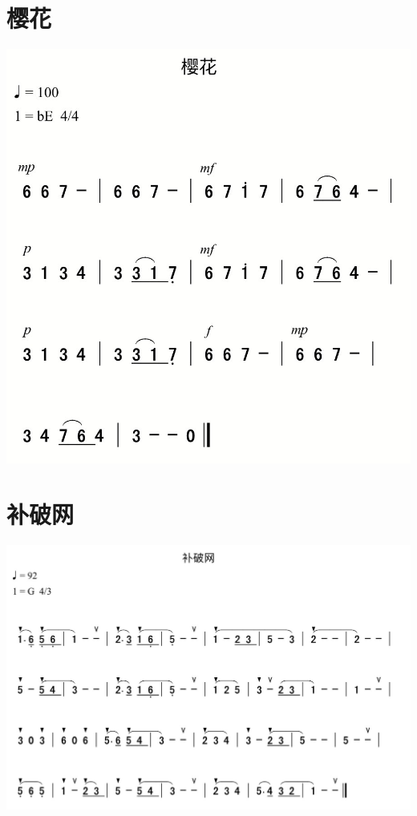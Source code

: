 \documentclass[cn,pad,chinese,chinesefont=nofont]{elegantbook}
\begin{document}
\section{樱花}
	\includegraphics[width=\textwidth]{dongxiao/IMG_0861-樱花.png}   
\section{补破网}           
	\includegraphics[width=\textwidth]{dongxiao/IMG_0868-补破网.png}
\end{document}

